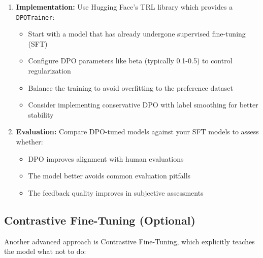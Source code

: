 \documentclass[11pt]{article}
\begin{document}
\begin{enumerate}
    \item \textbf{Implementation:} Use Hugging Face's TRL library which provides a \texttt{DPOTrainer}:
    \begin{itemize}
        \item Start with a model that has already undergone supervised fine-tuning (SFT)
        \item Configure DPO parameters like beta (typically 0.1-0.5) to control regularization
        \item Balance the training to avoid overfitting to the preference dataset
        \item Consider implementing conservative DPO with label smoothing for better stability
    \end{itemize}
    
    \item \textbf{Evaluation:} Compare DPO-tuned models against your SFT models to assess whether:
    \begin{itemize}
        \item DPO improves alignment with human evaluations
        \item The model better avoids common evaluation pitfalls
        \item The feedback quality improves in subjective assessments
    \end{itemize}
\end{enumerate}

\subsection{Contrastive Fine-Tuning (Optional)}

Another advanced approach is Contrastive Fine-Tuning, which explicitly teaches the model what not to do:
\end{document}
